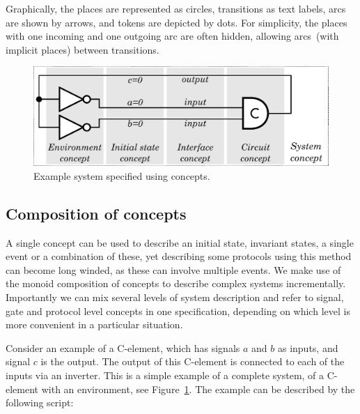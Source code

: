 \documentclass[british, journal]{IEEEtran}
\begin{document}
Graphically, the places are represented as circles, transitions as
text labels, arcs are shown by arrows, and tokens are depicted by dots.
For simplicity, the places with one incoming
and one outgoing arc are often hidden, allowing arcs~(with implicit
places) between transitions.

\begin{figure}[t]
\begin{centering}
\includegraphics[scale=0.51]{Images/C-element-with-environment}
\par\end{centering}
\vspace{-1mm}
\protect\caption{\label{fig:cElement-concepts}Example system specified using
concepts.}
\vspace{-5mm}
\end{figure}

\vspace{-1mm}
\subsection{Composition of concepts\label{sub:Comp-of-concepts}}

A single concept can be used to describe an initial state, invariant
states, a single event or a combination of these, yet describing some
protocols using this method can become long winded, as these can involve
multiple events. We make use of the monoid composition of concepts
to describe complex systems incrementally. Importantly we can mix
several levels of system description and refer to signal, gate and
protocol level concepts in one specification, depending on which level
is more convenient in a particular situation.

Consider an example of a C-element, which has signals $a$ and $b$ as inputs,
and signal $c$ is the output. The output of this C-element is connected to
each of the inputs via an inverter. This is a simple example of a complete
system, of a C-element with an environment, see
Figure~\ref{fig:cElement-concepts}.
The example can be described by the following script:
\end{document}

